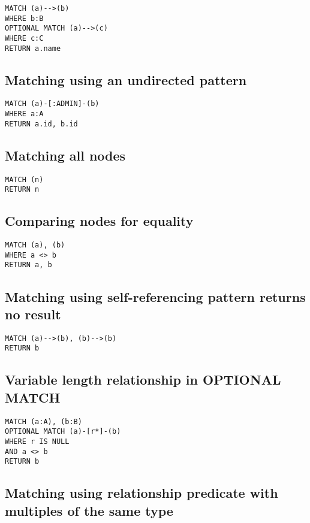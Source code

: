 \begin{lstlisting}
MATCH (a)-->(b)
WHERE b:B
OPTIONAL MATCH (a)-->(c)
WHERE c:C
RETURN a.name
\end{lstlisting}

\subsection{Matching using an undirected pattern}

\begin{lstlisting}
MATCH (a)-[:ADMIN]-(b)
WHERE a:A
RETURN a.id, b.id
\end{lstlisting}

\subsection{Matching all nodes}

\begin{lstlisting}
MATCH (n)
RETURN n
\end{lstlisting}

\subsection{Comparing nodes for equality}

\begin{lstlisting}
MATCH (a), (b)
WHERE a <> b
RETURN a, b
\end{lstlisting}

\subsection{Matching using self-referencing pattern returns no result}

\begin{lstlisting}
MATCH (a)-->(b), (b)-->(b)
RETURN b
\end{lstlisting}

\subsection{Variable length relationship in OPTIONAL MATCH}

\begin{lstlisting}
MATCH (a:A), (b:B)
OPTIONAL MATCH (a)-[r*]-(b)
WHERE r IS NULL
AND a <> b
RETURN b
\end{lstlisting}

\subsection{Matching using relationship predicate with multiples of the same type}


